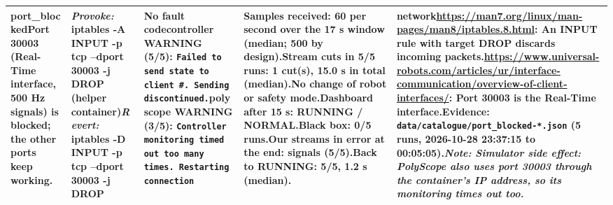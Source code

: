 \documentclass[10pt]{article}
\begin{document}
\begin{longtable}{@{}>{\raggedright\arraybackslash}p{2.7cm}>{\raggedright\arraybackslash}p{4.0cm}>{\raggedright\arraybackslash}p{7.6cm}>{\raggedright\arraybackslash}p{5.2cm}>{\raggedright\arraybackslash}p{6.0cm}@{}}
\textbf{port\_\allowbreak{}blocked}\newline Port 30003 (Real-Time interface,\allowbreak{} 500 Hz signals) is blocked; the other ports keep working. & \textit{Provoke:} iptables -A INPUT -p tcp --dport 30003 -j DROP  (helper container)\newline\textit{Revert:} iptables -D INPUT -p tcp --dport 30003 -j DROP & \textbf{No fault code}\newline \textsf{controller} WARNING (5/5): \texttt{Failed to send state to client \#. Sending discontinued.}\newline \textsf{polyscope} WARNING (3/5): \texttt{Controller monitoring timed out too many times. Restarting connection} & Samples received: 60 per second over the 17 s window (median; 500 by design).\newline Stream cuts in 5/5 runs: 1 cut(s), 15.0 s in total (median).\newline No change of robot or safety mode.\newline Dashboard after 15 s: RUNNING / NORMAL.\newline Black box: 0/5 runs.\newline Our streams in error at the end: signals (5/5).\newline Back to RUNNING: 5/5, 1.2 s (median). & \textbf{network}\newline \url{https://man7.org/linux/man-pages/man8/iptables.8.html}: An INPUT rule with target DROP discards incoming packets.\newline \url{https://www.universal-robots.com/articles/ur/interface-communication/overview-of-client-interfaces/}: Port 30003 is the Real-Time interface.\newline Evidence: \texttt{data/catalogue/port\_\allowbreak{}blocked-*.json} (5 runs, 2026-10-28 23:37:15 to 00:05:05).\newline \textit{Note: Simulator side effect: PolyScope also uses port 30003 through the container's IP address,\allowbreak{} so its monitoring times out too.} \\ \midrule

\end{longtable}
\end{document}
